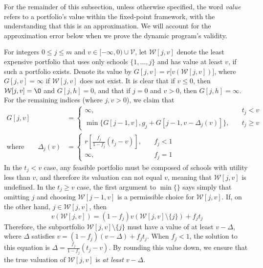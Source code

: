 \documentclass[12pt]{article} %
\theoremstyle{definition}
\theoremstyle{definition}
\begin{document}
For the remainder of this subsection, unless otherwise specified, the word \emph{value} refers to a portfolio’s value within the fixed-point framework, with the understanding that this is an approximation. We will account for the approximation error below when we prove the dynamic program’s validity. 

For integers $0 \leq j \leq m$ and $v \in [-\infty, 0) \cup \mathcal{V}$, let $\mathcal{W}[j, v]$ denote the least expensive portfolio that uses only schools $\{ 1, \dots, j\}$ and has value at least $v$, if such a portfolio exists. Denote its value by $G[j, v] = r\bigl[v(\mathcal{W}[j, v])\bigr]$, where $G[j, v] = \infty$ if $\mathcal{W}[j, v]$ does not exist. It is clear that if $v \leq 0$, then $\mathcal{W}[j, v] = \O$ and $G[j, h] = 0$, and that if $j = 0$ and $v > 0$, then $G[j, h] = \infty$.  For the remaining indices (where $j, v > 0$), we claim that
\begin{align} \label{recursionrelationforcostmindp}
G[j, v] &=
\begin{cases}
\infty, \quad & t_j < v \\
\min\bigl\{G[j-1, v], g_j + G[j-1, v - \Delta_j(v)] \bigr\}, \quad & t_j \geq v 
\end{cases}\\
\text{where}\qquad
\Delta_j (v) &= 
\begin{cases}
r\left[\frac{f_j}{1 - f_j} (t_j - v)\right], \quad & f_j < 1\\
\infty, &f_j = 1
\end{cases} \label{deltajvdef}
\end{align}
In the $t_j < v$ case, any feasible portfolio must be composed of schools with utility less than $v$, and therefore its valuation can not equal $v$, meaning that $\mathcal{W}[j, v]$ is undefined. In the $t_j \geq v$ case, the first argument to $\min\{\}$ says simply that omitting $j$ and choosing $\mathcal{W}[j-1, v]$ is a permissible choice for $\mathcal{W}[j, v]$. If, on the other hand, $j \in \mathcal{W}[j, v]$, then
\begin{equation} \label{solvemeforvwjvminusj}
v(\mathcal{W}[j, v]) = (1 - f_j )v(\mathcal{W}[j, v]\setminus \{j\}) + f_j t_j\end{equation}
Therefore, the subportfolio $\mathcal{W}[j, v]\setminus \{j\}$ must have a value of at least $v - \Delta$, where $\Delta$ satisfies $v = (1 - f_j )(v - \Delta) + f_j t_j $. When $f_j < 1$, the solution to this equation is $ \Delta = \frac{f_j}{1 - f_j} (t_j - v)$. By rounding this value down, we ensure that the true valuation of $\mathcal{W}[j, v]$ is \emph{at least} $v - \Delta$. 
\end{document}
